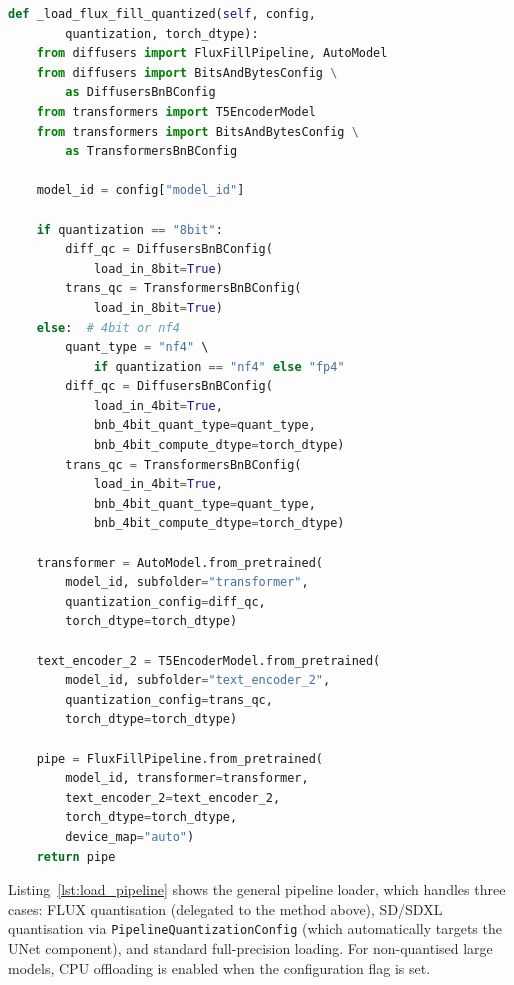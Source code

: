 \documentclass[12pt,a4paper]{report}
\begin{document}
\begin{lstlisting}[language=Python, caption={FLUX.1 Fill quantised loading (\texttt{diffusion.py})}, label={lst:flux_quantized}]
def _load_flux_fill_quantized(self, config,
        quantization, torch_dtype):
    from diffusers import FluxFillPipeline, AutoModel
    from diffusers import BitsAndBytesConfig \
        as DiffusersBnBConfig
    from transformers import T5EncoderModel
    from transformers import BitsAndBytesConfig \
        as TransformersBnBConfig

    model_id = config["model_id"]

    if quantization == "8bit":
        diff_qc = DiffusersBnBConfig(
            load_in_8bit=True)
        trans_qc = TransformersBnBConfig(
            load_in_8bit=True)
    else:  # 4bit or nf4
        quant_type = "nf4" \
            if quantization == "nf4" else "fp4"
        diff_qc = DiffusersBnBConfig(
            load_in_4bit=True,
            bnb_4bit_quant_type=quant_type,
            bnb_4bit_compute_dtype=torch_dtype)
        trans_qc = TransformersBnBConfig(
            load_in_4bit=True,
            bnb_4bit_quant_type=quant_type,
            bnb_4bit_compute_dtype=torch_dtype)

    transformer = AutoModel.from_pretrained(
        model_id, subfolder="transformer",
        quantization_config=diff_qc,
        torch_dtype=torch_dtype)

    text_encoder_2 = T5EncoderModel.from_pretrained(
        model_id, subfolder="text_encoder_2",
        quantization_config=trans_qc,
        torch_dtype=torch_dtype)

    pipe = FluxFillPipeline.from_pretrained(
        model_id, transformer=transformer,
        text_encoder_2=text_encoder_2,
        torch_dtype=torch_dtype,
        device_map="auto")
    return pipe
\end{lstlisting}

Listing~\ref{lst:load_pipeline} shows the general pipeline loader, which handles three cases: FLUX quantisation (delegated to the method above), SD/SDXL quantisation via \texttt{Pipeline\-Quantization\-Config} (which automatically targets the UNet component), and standard full-precision loading. For non-quantised large models, CPU offloading is enabled when the configuration flag is set.
\end{document}
